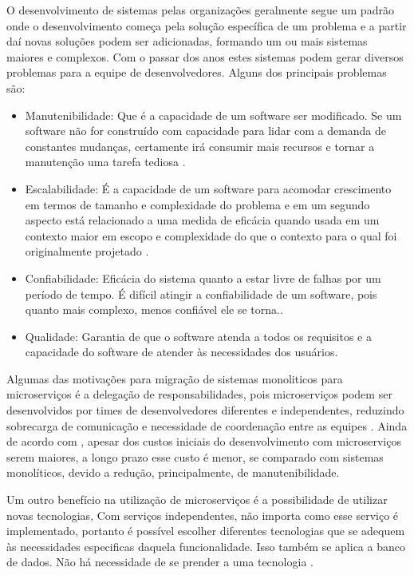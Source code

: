 \documentclass[12pt]{article}
\begin{document}
O desenvolvimento de sistemas pelas organizações geralmente segue um padrão onde o desenvolvimento começa pela solução específica de um problema e a partir daí novas soluções podem ser adicionadas, formando um ou mais sistemas maiores e complexos. Com o passar dos anos estes sistemas podem gerar diversos problemas para a equipe de desenvolvedores. Alguns dos principais problemas são:
\begin{itemize}
	\item Manutenibilidade: Que é a capacidade de um software ser modificado. Se um software não for construído com capacidade para lidar com a demanda de constantes mudanças, certamente irá consumir mais recursos e tornar a manutenção uma tarefa tediosa \cite{Velmourougan2014}.
	\item Escalabilidade: É a capacidade de um software para acomodar crescimento em termos de tamanho e complexidade do problema e em um segundo aspecto está relacionado a uma medida de eficácia quando usada em um contexto maior em escopo e complexidade do que o contexto para o qual foi originalmente projetado \cite{Ibrahim2009}.
	\item Confiabilidade: Eficácia do sistema quanto a estar livre de falhas por um período de tempo. É difícil atingir a confiabilidade de um software, pois quanto mais complexo, menos confiável ele se torna.\cite{pan1999}.
	\item Qualidade: Garantia de que o software atenda a todos os requisitos e a capacidade do software de atender às necessidades dos usuários.
\end{itemize}

Algumas das motivações para migração de sistemas monoliticos para microserviços é a delegação de responsabilidades, pois microserviços podem ser desenvolvidos por times de desenvolvedores diferentes e independentes, reduzindo sobrecarga de comunicação e necessidade de coordenação entre as equipes \cite{Taibi}. Ainda de acordo com \cite{Taibi}, apesar dos custos iniciais do desenvolvimento com microserviços serem maiores, a longo prazo esse custo é menor, se comparado com sistemas monolíticos, devido a redução, principalmente, de manutenibilidade. 

Um outro benefício na utilização de microserviços é a possibilidade de utilizar novas tecnologias, Com serviços independentes, não importa como esse serviço é implementado, portanto é possível escolher diferentes tecnologias que se adequem às necessidades especificas daquela funcionalidade. Isso também se aplica a banco de dados. Não há necessidade de se prender a uma tecnologia \cite{Richter2017a}.
\end{document}
